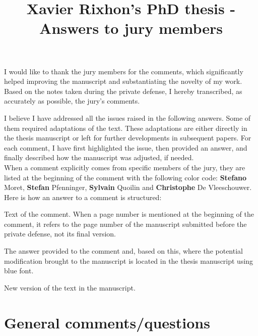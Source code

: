 \documentclass[12pt,a4paper]{article}
\title{\vspace{-1cm}
\begin{flushleft} {\sffamily Xavier Rixhon's PhD thesis - Answers to jury members}\end{flushleft}}
\date{\vspace{-1.7cm}\begin{flushleft}\sffamily Exploration of uncertainty-aware energy transition pathways - Reinforcement learning and principal component analysis-based methods\end{flushleft}}
\begin{document}
\maketitle

I would like to thank the jury members for the comments, which significantly helped improving the manuscript and substantiating the novelty of my work. Based on the notes taken during the private defense, I hereby transcribed, as accurately as possible, the jury's comments. 

I believe I have addressed all the issues raised in the following answers. Some of them required adaptations of the text. These adaptations are either directly in the thesis manuscript or left for further developments in subsequent papers. For each comment, I have first highlighted the issue, then provided an answer, and finally described how the manuscript was adjusted, if needed.\\

When a comment explicitly comes from specific members of the jury, they are listed at the beginning of the comment with the following color code: {\color{orange} \textbf{Stefano} Moret}, {\color{teal} \textbf{Stefan} Pfenninger}, {\color{purple} \textbf{Sylvain} Quoilin} and {\color{violet} \textbf{Christophe} De Vleeschouwer}. Here is how an answer to a comment is structured:

\begin{mdframed}[style=comment] %
Text of the comment. When a page number is mentioned at the beginning of the comment, it refers to the page number of the manuscript submitted before the private defense, not its final version.
\end{mdframed}

\noindent The answer provided to the comment and, based on this, where the potential modification brought to the manuscript is located in the thesis manuscript using {\color{blue} blue font}.

\begin{mdframed}[style=manuscript] %
New version of the text in the manuscript.
\end{mdframed}


\clearpage

\section{General comments/questions}
\label{General}
\end{document}
